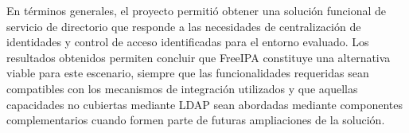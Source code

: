 En términos generales, el proyecto permitió obtener una solución funcional de servicio de directorio que responde a las necesidades de centralización de identidades y control de acceso identificadas para el entorno evaluado. Los resultados obtenidos permiten concluir que FreeIPA constituye una alternativa viable para este escenario, siempre que las funcionalidades requeridas sean compatibles con los mecanismos de integración utilizados y que aquellas capacidades no cubiertas mediante LDAP sean abordadas mediante componentes complementarios cuando formen parte de futuras ampliaciones de la solución.

